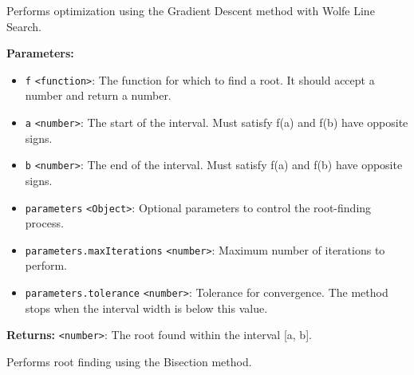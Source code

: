 \documentclass[12pt,a4paper]{article}
\begin{document}
\noindent Performs optimization using the Gradient Descent method with Wolfe Line Search.

\vspace{5mm}
\noindent {}


\noindent \textbf{Parameters:}
\begin{itemize}
  \item \texttt{f} \texttt{<function>}: The function for which to find a root. It should accept a number and return a number.
  \item \texttt{a} \texttt{<number>}: The start of the interval. Must satisfy f(a) and f(b) have opposite signs.
  \item \texttt{b} \texttt{<number>}: The end of the interval. Must satisfy f(a) and f(b) have opposite signs.
  \item \texttt{parameters} \texttt{<Object>}: Optional parameters to control the root-finding process.
  \item \texttt{parameters.maxIterations} \texttt{<number>}: Maximum number of iterations to perform.
  \item \texttt{parameters.tolerance} \texttt{<number>}: Tolerance for convergence. The method stops when the interval width is below this value.
\end{itemize}

\noindent \textbf{Returns:} \texttt{<number>}: The root found within the interval [a, b].

\noindent Performs root finding using the Bisection method.

\vspace{5mm}
\noindent {}
\end{document}
